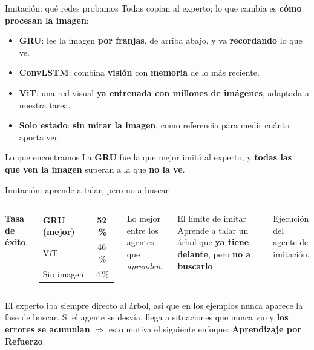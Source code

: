 \documentclass[aspectratio=169,10pt]{beamer}
\newcommand{\hl}[1]{\textcolor{UDCmag}{\textbf{#1}}}
\begin{document}
\begin{frame}{Imitación: qué redes probamos}
  Todas copian al experto; lo que cambia es \hl{cómo procesan la imagen}:
  \begin{itemize}\itemsep5pt
    \item \hl{GRU}: lee la imagen \hl{por franjas}, de arriba abajo, y
    va \hl{recordando} lo que ve.
    \item \hl{ConvLSTM}: combina \hl{visión} con \hl{memoria} de lo más reciente.
    \item \hl{ViT}: una red visual \hl{ya entrenada con millones de imágenes}, adaptada a
    nuestra tarea.
    \item \hl{Solo estado}: \hl{sin mirar la imagen}, como referencia para medir cuánto
    aporta ver.
  \end{itemize}

  \vspace{0.4em}
  \begin{alertblock}{Lo que encontramos}
    La \hl{GRU} fue la que mejor imitó al experto, y \hl{todas las que ven la imagen}
    superan a la que \hl{no la ve}.
  \end{alertblock}
\end{frame}

\begin{frame}{Imitación: aprende a talar, pero no a buscar}
  \begin{columns}[T]
      \textbf{Tasa de éxito}
      \begin{table}\centering\small
        \begin{tabular}{@{}lc@{}}
          \toprule
          \hl{GRU (mejor)} & \hl{52\,\%}\\
          ViT & 46\,\%\\
          Sin imagen & 4\,\%\\
          \bottomrule
        \end{tabular}
      \end{table}
      \footnotesize Lo mejor entre los agentes que \emph{aprenden}.

      \vspace{0.6em}
      \begin{alertblock}{El límite de imitar}
        \footnotesize Aprende a talar un árbol que \hl{ya tiene delante},
        pero \hl{no a buscarlo}.
      \end{alertblock}

      \centering
      \vspace{0.3em}
      {\scriptsize Ejecución del agente de imitación.}
  \end{columns}

  \vspace{0.5em}
  \footnotesize
  El experto iba siempre directo al árbol, así que en los ejemplos \alert{nunca aparece la
  fase de buscar}. Si el agente se desvía, llega a situaciones que nunca vio y
  \hl{los errores se acumulan} $\Rightarrow$ esto motiva el siguiente enfoque:
  \textbf{Aprendizaje por Refuerzo}.
\end{frame}
\end{document}
